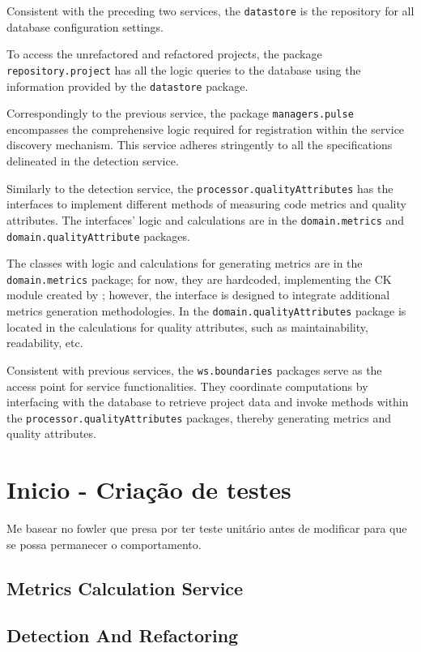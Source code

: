Consistent with the preceding two services, the \verb|datastore| is the repository for all database configuration settings.

To access the unrefactored and refactored projects, the package \verb|repository.project| has all the logic queries to the database using the information provided by the \verb|datastore| package.

Correspondingly to the previous service, the package \verb|managers.pulse| encompasses the comprehensive logic required for registration within the service discovery mechanism. This service adheres stringently to all the specifications delineated in the detection service.

Similarly to the detection service, the \verb|processor.qualityAttributes| has the interfaces to implement different methods of measuring code metrics and quality attributes. The interfaces' logic and calculations are in the \verb |domain.metrics| and \verb|domain.qualityAttribute| packages.

The classes with logic and calculations for generating metrics are in the \verb|domain.metrics| package; for now, they are hardcoded, implementing the CK module created by \textcite{ck}; however, the interface is designed to integrate additional metrics generation methodologies. In the \verb|domain.qualityAttributes| package is located in the calculations for quality attributes, such as maintainability, readability, etc.

Consistent with previous services, the \verb|ws.boundaries| packages serve as the access point for service functionalities. They coordinate computations by interfacing with the database to retrieve project data and invoke methods within the \verb|processor.qualityAttributes| packages, thereby generating metrics and quality attributes.
 
\section{Inicio - Criação de testes}

Me basear no fowler que presa por ter teste unitário antes de modificar para que se possa permanecer o comportamento.

\subsection{Metrics Calculation Service}

\subsection{Detection And Refactoring}

